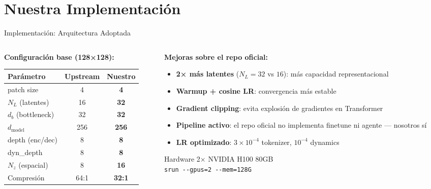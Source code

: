 \documentclass[aspectratio=169, 12pt]{beamer}
\begin{document}
\section{Nuestra Implementación}

\begin{frame}{Implementación: Arquitectura Adoptada}
\begin{columns}[T]
  \begin{column}{0.5\textwidth}
    \textbf{Configuración base (128×128):}

    \vspace{6pt}
    \begin{tabular}{lcc}
      \toprule
      \textbf{Parámetro} & \textbf{Upstream} & \textbf{Nuestro} \\
      \midrule
      patch size        & 4        & \textbf{4} \\
      $N_L$ (latentes)  & 16       & \textbf{32} \\
      $d_b$ (bottleneck)& 32       & \textbf{32} \\
      $d_\text{model}$  & 256      & \textbf{256} \\
      depth (enc/dec)   & 8        & \textbf{8} \\
      dyn\_depth        & 8        & \textbf{8} \\
      $N_z$ (espacial)  & 8        & \textbf{16} \\
      Compresión        & 64:1     & \textbf{32:1} \\
      \bottomrule
    \end{tabular}
  \end{column}
  \begin{column}{0.48\textwidth}
    \textbf{Mejoras sobre el repo oficial:}
    \begin{itemize}
      \item \textbf{2× más latentes} ($N_L{=}32$ vs $16$): más capacidad representacional
      \item \textbf{Warmup + cosine LR}: convergencia más estable
      \item \textbf{Gradient clipping}: evita explosión de gradientes en Transformer
      \item \textbf{Pipeline activo}: el repo oficial no implementa finetune ni agente — nosotros sí
      \item \textbf{LR optimizado}: $3{\times}10^{-4}$ tokenizer, $10^{-4}$ dynamics
    \end{itemize}

    \vspace{6pt}
    \begin{block}{Hardware}
      2× NVIDIA H100 80GB\\
      \texttt{srun -{}-gpus=2 -{}-mem=128G}
    \end{block}
  \end{column}
\end{columns}
\end{frame}
\end{document}
